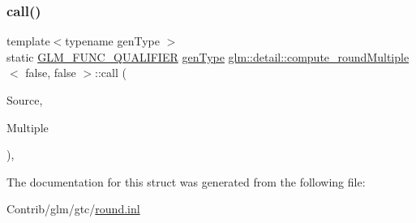 \subsubsection{\texorpdfstring{call()}{call()}}
{\footnotesize\ttfamily template$<$typename gen\+Type $>$ \\
static \mbox{\hyperlink{setup_8hpp_a33fdea6f91c5f834105f7415e2a64407}{G\+L\+M\+\_\+\+F\+U\+N\+C\+\_\+\+Q\+U\+A\+L\+I\+F\+I\+ER}} \mbox{\hyperlink{structglm_1_1detail_1_1gen_type}{gen\+Type}} \mbox{\hyperlink{structglm_1_1detail_1_1compute__round_multiple}{glm\+::detail\+::compute\+\_\+round\+Multiple}}$<$ false, false $>$\+::call (\begin{DoxyParamCaption}\item[{\mbox{\hyperlink{structglm_1_1detail_1_1gen_type}{gen\+Type}}}]{Source,  }\item[{\mbox{\hyperlink{structglm_1_1detail_1_1gen_type}{gen\+Type}}}]{Multiple }\end{DoxyParamCaption})\hspace{0.3cm}{\ttfamily [inline]}, {\ttfamily [static]}}



The documentation for this struct was generated from the following file\+:\begin{DoxyCompactItemize}
\item 
Contrib/glm/gtc/\mbox{\hyperlink{round_8inl}{round.\+inl}}\end{DoxyCompactItemize}
